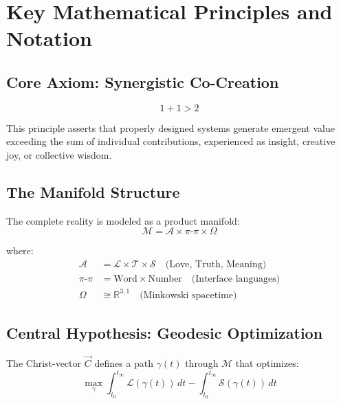 \documentclass[11pt,a4paper]{article}
\begin{document}
\vspace{1cm}

\section*{Key Mathematical Principles and Notation}

\subsection*{Core Axiom: Synergistic Co-Creation}
\begin{equation}
1 + 1 > 2
\label{eq:synergy}
\end{equation}

\noindent This principle asserts that properly designed systems generate emergent value exceeding the sum of individual contributions, experienced as insight, creative joy, or collective wisdom.

\subsection*{The Manifold Structure}
The complete reality is modeled as a product manifold:
\begin{equation}
\mathcal{M} = \mathcal{A} \times \pi\text{-}\pi \times \Omega
\label{eq:manifold}
\end{equation}

where:
\begin{align}
\mathcal{A} &= \mathcal{L} \times \mathcal{T} \times \mathcal{S} \quad \text{(Love, Truth, Meaning)} \label{eq:alpha}\\
\pi\text{-}\pi &= \text{Word} \times \text{Number} \quad \text{(Interface languages)} \label{eq:psyche}\\
\Omega &\cong \mathbb{R}^{3,1} \quad \text{(Minkowski spacetime)} \label{eq:omega}
\end{align}

\subsection*{Central Hypothesis: Geodesic Optimization}
The Christ-vector $\vec{C}$ defines a path $\gamma(t)$ through $\mathcal{M}$ that optimizes:
\begin{equation}
\max_{\gamma} \int_{t_0}^{t_{\infty}} \mathcal{L}(\gamma(t)) \, dt - \int_{t_0}^{t_{\infty}} \mathcal{S}(\gamma(t)) \, dt
\label{eq:geodesic}
\end{equation}
\end{document}
